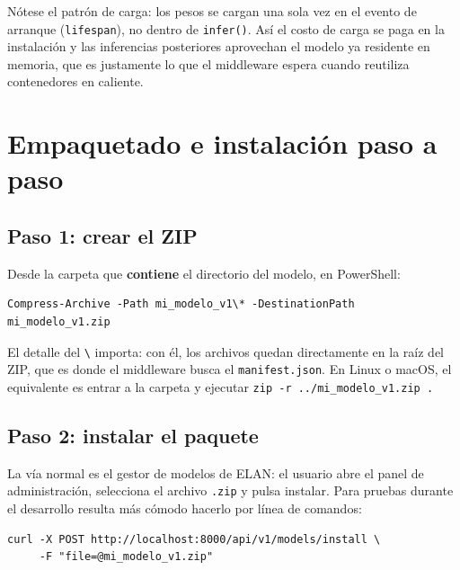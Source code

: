 \documentclass[12pt,a4paper]{article}
\begin{document}
Nótese el patrón de carga: los pesos se cargan una sola vez en el evento de arranque (\texttt{lifespan}), no dentro de \texttt{infer()}. Así el costo de carga se paga en la instalación y las inferencias posteriores aprovechan el modelo ya residente en memoria, que es justamente lo que el middleware espera cuando reutiliza contenedores en caliente.

\section{Empaquetado e instalación paso a paso}

\subsection{Paso 1: crear el ZIP}

Desde la carpeta que \textbf{contiene} el directorio del modelo, en PowerShell:

\begin{center}
\begin{minipage}{0.9\textwidth}
\small
\begin{Verbatim}[baselinestretch=0.9]
Compress-Archive -Path mi_modelo_v1\* -DestinationPath mi_modelo_v1.zip
\end{Verbatim}
\end{minipage}
\end{center}

El detalle del \texttt{\textbackslash*} importa: con él, los archivos quedan directamente en la raíz del ZIP, que es donde el middleware busca el \texttt{manifest.json}. En Linux o macOS, el equivalente es entrar a la carpeta y ejecutar \texttt{zip -r ../mi\_modelo\_v1.zip .}

\subsection{Paso 2: instalar el paquete}

La vía normal es el gestor de modelos de ELAN: el usuario abre el panel de administración, selecciona el archivo \texttt{.zip} y pulsa instalar. Para pruebas durante el desarrollo resulta más cómodo hacerlo por línea de comandos:

\begin{center}
\begin{minipage}{0.9\textwidth}
\small
\begin{Verbatim}[baselinestretch=0.9]
curl -X POST http://localhost:8000/api/v1/models/install \
     -F "file=@mi_modelo_v1.zip"
\end{Verbatim}
\end{minipage}
\end{center}
\end{document}
